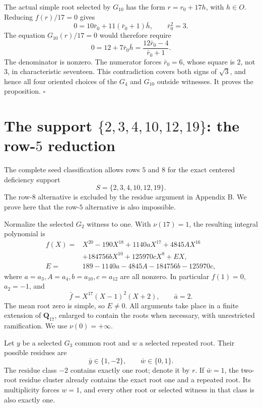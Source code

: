 \documentclass[
  british,
  10pt,
  a4paper,
]{article}
\begin{document}
The actual simple root selected by \(G_{10}\) has the form
\(r=r_0+17h\), with \(h\in O\). Reducing \(f(r)/17=0\) gives \[
0=10\bar r_0+11(\bar r_0+1)\bar h,
\qquad \bar r_0^2=3.
\] The equation \(G_{10}(r)/17=0\) would therefore require \[
0=12+7\bar r_0\bar h
 =\frac{12\bar r_0-4}{\bar r_0+1}.
\tag{R2.13}
\] The denominator is nonzero. The numerator forces \(\bar r_0=6\),
whose square is \(2\), not \(3\), in characteristic seventeen. This
contradiction covers both signs of \(\sqrt3\), and hence all four
oriented choices of the \(G_4\) and \(G_{10}\) outside witnesses. It
proves the proposition. \(\square\)

\section{\texorpdfstring{The support \(\{2,3,4,10,12,19\}\): the
row-\(5\)
reduction}{The support \textbackslash\{2,3,4,10,12,19\textbackslash\}: the row-5 reduction}}\label{the-support-234101219-the-row-5-reduction}

The complete seed classification allows rows \(5\) and \(8\) for the
exact centered deficiency support \[
S=\{2,3,4,10,12,19\}.
\] The row-\(8\) alternative is excluded by the residue argument in
Appendix B. We prove here that the row-\(5\) alternative is also
impossible.

Normalize the selected \(G_2\) witness to one. With \(\nu(17)=1\), the
resulting integral polynomial is \[
\begin{aligned}
f(X)={}&X^{20}-190X^{18}+1140aX^{17}+4845AX^{16}\\
&+184756bX^{10}+125970cX^8+EX,\\
E={}&189-1140a-4845A-184756b-125970c,
\end{aligned}                                                   \tag{R1}
\] where \(a=a_3,A=a_4,b=a_{10},c=a_{12}\) are all nonzero. In
particular \(f(1)=0\), \(a_2=-1\), and \[
\bar f=X^{17}(X-1)^2(X+2),\qquad \bar a=2.                      \tag{R2}
\] The mean root zero is simple, so \(E\neq0\). All arguments take place
in a finite extension of \(\mathbf Q_{17}\), enlarged to contain the
roots when necessary, with unrestricted ramification. We use
\(\nu(0)=+\infty\).

Let \(y\) be a selected \(G_3\) common root and \(w\) a selected
repeated root. Their possible residues are \[
\bar y\in\{1,-2\},\qquad \bar w\in\{0,1\}.
\] The residue class \(-2\) contains exactly one root; denote it by
\(r\). If \(\bar w=1\), the two-root residue cluster already contains
the exact root one and a repeated root. Its multiplicity forces \(w=1\),
and every other root or selected witness in that class is also exactly
one.
\end{document}
